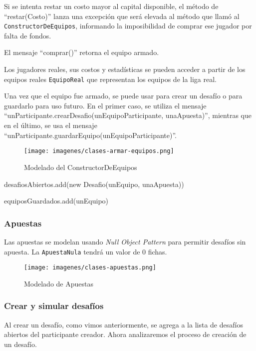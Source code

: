 Si se intenta restar un costo mayor al capital disponible, el método de ``restar(Costo)'' lanza una excepción que será elevada al método que llamó
al {\tt ConstructorDeEquipos}, informando la imposibilidad de comprar ese jugador por falta de fondos.

El mensaje ``comprar()'' retorna el equipo armado.

Los jugadores reales, sus costos y estadísticas se pueden acceder a partir de los equipos reales {\tt EquipoReal} que representan los equipos de la 
liga real.

Una vez que el equipo fue armado, se puede usar para crear un desafío o para guardarlo para uso futuro. En el primer caso, se utiliza el mensaje
``unParticipante.crearDesafio(unEquipoParticipante, unaApuesta)'', mientras que en el último, se usa el
mensaje ``unParticipante.guardarEquipo(unEquipoParticipante)''.

\begin{figure}[h!]
   \texttt{[image: imagenes/clases-armar-equipos.png]}
   \caption{Modelado del ConstructorDeEquipos}
\end{figure}

\begin{algorithmic}
	  \State desafiosAbiertos.add(new Desafio(unEquipo, unaApuesta))
	\EndFunction
\end{algorithmic}

\begin{algorithmic}
	  \State equiposGuardados.add(unEquipo)
	\EndFunction
\end{algorithmic}

\subsubsection{Apuestas}
Las apuestas se modelan usando \emph{Null Object Pattern} para permitir desafíos sin apuesta. La {\tt ApuestaNula} tendrá un valor de 0 fichas.

\begin{figure}[h!]
   \texttt{[image: imagenes/clases-apuestas.png]}
   \caption{Modelado de Apuestas}
\end{figure}


\subsubsection{Crear y simular desafíos}
Al crear un desafío, como vimos anteriormente, se agrega a la lista de desafíos abiertos del participante creador. Ahora analizaremos el proceso de
creación de un desafío.

